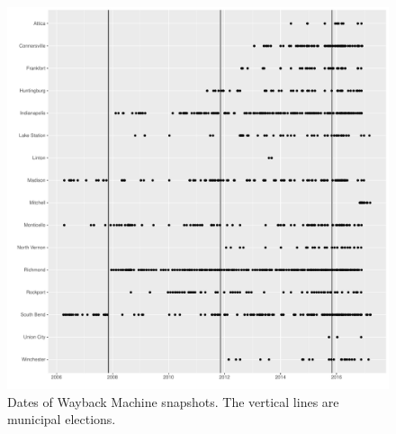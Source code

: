 \documentclass[11pt]{article}
\begin{document}


\begin{figure}[!ht]
	\centering
	\caption{Dates of Wayback Machine snapshots. The vertical lines are municipal elections.}
	\label{snapshots}
	\includegraphics[width=\linewidth]{figures/Snapshots.pdf}
\end{figure}
\end{document}
